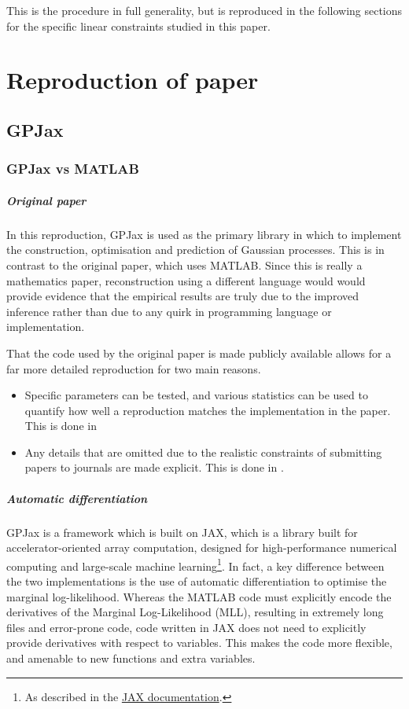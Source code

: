 \documentclass[12pt,a4paper,twoside]{report}
\theoremstyle{definition}
\begin{document}
This is the procedure in full generality, but is reproduced in the following sections for the specific linear constraints studied in this paper.

\chapter{Reproduction of paper}

\section{GPJax}
\subsection{GPJax vs MATLAB}
\paragraph{Original paper}
In this reproduction, GPJax is used as the primary library in which to implement the construction, optimisation and prediction of Gaussian processes. This is in contrast to the original paper, which uses MATLAB. Since this is really a mathematics paper, reconstruction using a different language would would provide evidence that the empirical results are truly due to the improved inference rather than due to any quirk in programming language or implementation.

That the code used by the original paper is made publicly available allows for a far more detailed reproduction for two main reasons.
\begin{itemize}
	\item Specific parameters can be tested, and various statistics can be used to quantify how well a reproduction matches the implementation in the paper. This is done in 
	\item Any details that are omitted due to the realistic constraints of submitting papers to journals are made explicit. This is done in .
\end{itemize}

\paragraph{Automatic differentiation}
GPJax is a framework which is built on JAX, which is a library built for accelerator-oriented array computation, designed for high-performance numerical computing and large-scale machine learning\footnote{As described in the \href{https://jax.readthedocs.io/en/latest/}{JAX documentation}.}. In fact, a key difference between the two implementations is the use of automatic differentiation to optimise the marginal log-likelihood. Whereas the MATLAB code must explicitly encode the derivatives of the Marginal Log-Likelihood (MLL)\label{MLL}, resulting in extremely long files and error-prone code, code written in JAX does not need to explicitly provide derivatives with respect to variables. This makes the code more flexible, and amenable to new functions and extra variables.
\end{document}
